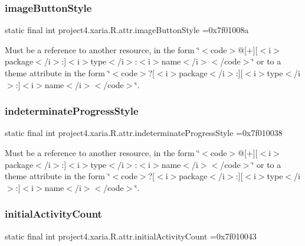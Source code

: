 \subsubsection{\texorpdfstring{image\+Button\+Style}{imageButtonStyle}}
{\footnotesize\ttfamily static final int project4.\+xaria.\+R.\+attr.\+image\+Button\+Style =0x7f01008a\hspace{0.3cm}{\ttfamily [static]}}

Must be a reference to another resource, in the form \char`\"{}$<$code$>$@\mbox{[}+\mbox{]}\mbox{[}$<$i$>$package$<$/i$>$\+:\mbox{]}$<$i$>$type$<$/i$>$\+:$<$i$>$name$<$/i$>$$<$/code$>$\char`\"{} or to a theme attribute in the form \char`\"{}$<$code$>$?\mbox{[}$<$i$>$package$<$/i$>$\+:\mbox{]}\mbox{[}$<$i$>$type$<$/i$>$\+:\mbox{]}$<$i$>$name$<$/i$>$$<$/code$>$\char`\"{}. \mbox{\label{classproject4_1_1xaria_1_1R_1_1attr_a421e64a7486a5a6c440076cfd07f7686}} 
\subsubsection{\texorpdfstring{indeterminate\+Progress\+Style}{indeterminateProgressStyle}}
{\footnotesize\ttfamily static final int project4.\+xaria.\+R.\+attr.\+indeterminate\+Progress\+Style =0x7f010038\hspace{0.3cm}{\ttfamily [static]}}

Must be a reference to another resource, in the form \char`\"{}$<$code$>$@\mbox{[}+\mbox{]}\mbox{[}$<$i$>$package$<$/i$>$\+:\mbox{]}$<$i$>$type$<$/i$>$\+:$<$i$>$name$<$/i$>$$<$/code$>$\char`\"{} or to a theme attribute in the form \char`\"{}$<$code$>$?\mbox{[}$<$i$>$package$<$/i$>$\+:\mbox{]}\mbox{[}$<$i$>$type$<$/i$>$\+:\mbox{]}$<$i$>$name$<$/i$>$$<$/code$>$\char`\"{}. \mbox{\label{classproject4_1_1xaria_1_1R_1_1attr_a10dc49382cd8712ac6802e84d813da40}} 
\subsubsection{\texorpdfstring{initial\+Activity\+Count}{initialActivityCount}}
{\footnotesize\ttfamily static final int project4.\+xaria.\+R.\+attr.\+initial\+Activity\+Count =0x7f010043\hspace{0.3cm}{\ttfamily [static]}}

